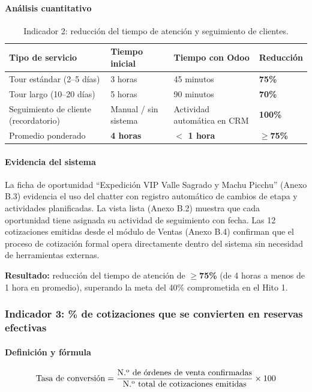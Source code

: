 \paragraph{Análisis cuantitativo}
\begin{table}[htbp]
\centering
\renewcommand{\arraystretch}{1.3}
\begin{tabular}{|p{5.0cm}|p{2.8cm}|p{2.8cm}|p{2.0cm}|}
\hline
\textbf{Tipo de servicio} & \textbf{Tiempo inicial} & \textbf{Tiempo con Odoo} & \textbf{Reducción} \\ \hline
Tour estándar (2--5 días) & 3 horas & 45 minutos & \textbf{75\%} \\ \hline
Tour largo (10--20 días) & 5 horas & 90 minutos & \textbf{70\%} \\ \hline
Seguimiento de cliente (recordatorio) & Manual / sin sistema & Actividad automática en CRM & \textbf{100\%} \\ \hline
Promedio ponderado & \textbf{4 horas} & \textbf{$<$ 1 hora} & \textbf{$\geq$75\%} \\ \hline
\end{tabular}
\caption{Indicador 2: reducción del tiempo de atención y seguimiento de clientes.}
\end{table}

\paragraph{Evidencia del sistema}
La ficha de oportunidad ``Expedición VIP Valle Sagrado y Machu Picchu'' (Anexo B.3) evidencia el uso del chatter con registro automático de cambios de etapa y actividades planificadas. La vista lista (Anexo B.2) muestra que cada oportunidad tiene asignada su actividad de seguimiento con fecha. Las 12 cotizaciones emitidas desde el módulo de Ventas (Anexo B.4) confirman que el proceso de cotización formal opera directamente dentro del sistema sin necesidad de herramientas externas.

\textbf{Resultado:} reducción del tiempo de atención de \textbf{$\geq$75\%} (de 4 horas a menos de 1 hora en promedio), superando la meta del 40\% comprometida en el Hito 1.

\subsubsection{Indicador 3: \% de cotizaciones que se convierten en reservas efectivas}

\paragraph{Definición y fórmula}
\[
\text{Tasa de conversi\'{o}n} = \frac{\text{N.\textsuperscript{o} de \'{o}rdenes de venta confirmadas}}{\text{N.\textsuperscript{o} total de cotizaciones emitidas}} \times 100
\]

